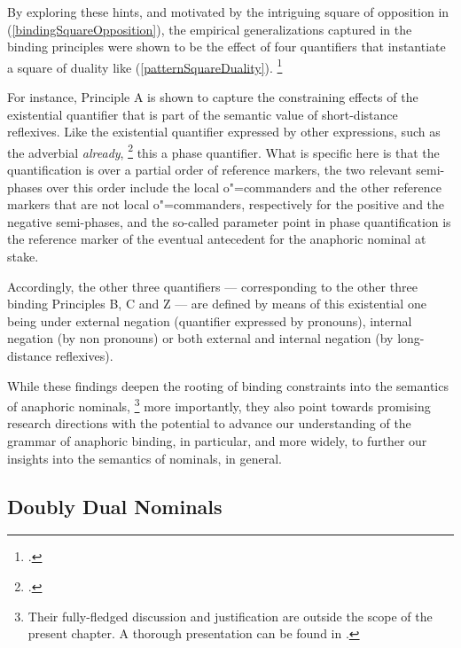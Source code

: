 \documentclass[output=paper
,modfonts
,nonflat]{langsci/langscibook}
\begin{document}
By exploring these hints, and motivated by the intriguing square of opposition in (\ref{bindingSquareOpposition}), 
the empirical generalizations captured in the binding principles were shown to be the effect 
of four quantifiers that instantiate a square of duality like (\ref{patternSquareDuality}).%
\footnote{
\citep{branco:1998,branco:2001,branco:2005,branco:2006}.
}


For instance, Principle A is shown to capture the constraining effects of the existential quantifier 
that is part of the semantic value of short-distance reflexives. Like the existential
quantifier expressed by other expressions, such as the adverbial \emph{already},%
\footnote{
\citep{Lobner1987}.
}
this a phase quantifier. What is specific here is that the quantification is over
a partial order of reference markers,  the two relevant semi-phases over this order
include the local o"=commanders and the other reference markers that are not
local o"=commanders, respectively for the positive and the negative semi-phases,
and the so-called parameter point in phase quantification is the reference
marker of the eventual antecedent for the anaphoric nominal at stake.

Accordingly, the other
three quantifiers --- corresponding to the other three binding Principles B, C and Z --- 
are defined by means of this existential one being under external negation (quantifier expressed by pronouns), 
internal negation (by non pronouns) or both external and internal negation (by long-distance reflexives).

While these findings deepen the rooting of binding constraints into the semantics of anaphoric nominals,%
\footnote{
Their fully-fledged discussion and justification are outside the scope of the present chapter. A thorough presentation can be found in \citep{branco:2005}.} more importantly, they also point towards promising research directions
with the potential to advance our understanding of the grammar of anaphoric binding, in particular, 
and more widely, to further our insights into the semantics of nominals, in general.


\subsection{Doubly Dual Nominals \label{dualNominals}}
\end{document}
